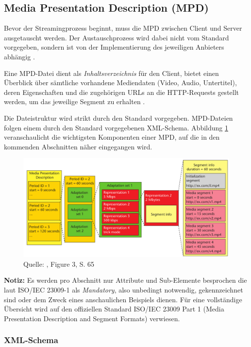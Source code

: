 \documentclass[paper = a4, fontsize = 12pt, parskip = half]{scrartcl} %
\begin{document}
\subsection{Media Presentation Description (MPD)}
Bevor der Streamingprozess beginnt, muss die MPD zwischen Client und Server ausgetauscht werden. Der Austauschprozess wird dabei nicht vom Standard vorgegeben, sondern ist von der Implementierung des jeweiligen Anbieters abhängig \cite{sodagar_mpeg-dash_2011}.

Eine MPD-Datei dient als \textit{Inhaltsverzeichnis} für den Client, bietet einen Überblick über sämtliche vorhandene Mediendaten (Video, Audio, Untertitel), deren Eigenschaften und die zugehörigen URLs an die HTTP-Requests gestellt werden, um das jeweilige Segment zu erhalten \cite{international_organization_for_standardization_isoiec_nodate}.

Die Dateistruktur wird strikt durch den Standard vorgegeben. MPD-Dateien folgen einem durch den Standard vorgegebenen XML-Schema. Abbildung \ref{mpd_components} veranschaulicht die wichtigsten Komponenten einer MPD, auf die in den kommenden Abschnitten näher eingegangen wird.

	\begin{figure}[ht]
		\centering
		\includegraphics[width=12cm]{images/mpd-structure.png}
		\caption{Quelle: \cite{sodagar_mpeg-dash_2011}, Figure 3, S. 65}
		\label{mpd_components}
	\end{figure}

\textbf{Notiz:} Es werden pro Abschnitt nur Attribute und Sub-Elemente besprochen die laut ISO/IEC 23009-1 als \textit{Mandatory}, also unbedingt notwendig, gekennzeichnet sind oder dem Zweck eines anschaulichen Beispiels dienen. Für eine vollständige Übersicht wird auf den offiziellen Standard ISO/IEC 23009 Part 1 (Media Presentation Description and Segment Formats) verwiesen.

\subsubsection{XML-Schema}
\end{document}
